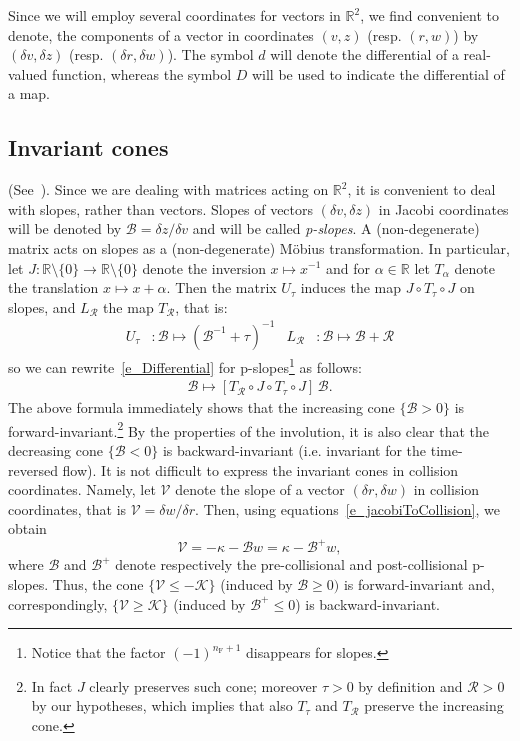 \documentclass[AHL, Unicode, longabstracts,published]{cedram}
\newcommand{\ct}{r}
\newcommand{\fft}{\tau}
\newcommand{\curv}{\kappa}
\newcommand{\inv}{^{-1}}
\newcommand{\fixw}{\mathrm{F}}
\newcommand{\reals}{\mathbb{R}}
\newcommand{\bR}{\mathbb{R}}
\newcommand{\cB}{\mathcal{B}}
\newcommand{\cK}{\mathcal{K}}
\newcommand{\cpar}{\mathcal{R}}
\newcommand{\pslope}{\mathcal{B}}
\newcommand{\cslope}{\mathcal{V}}
\newcommand{\ppPrivate}[2]{#1^{#2}}
\newcommand{\prePrivate}[1]{\ppPrivate{#1}{-}}
\newcommand{\postPrivate}[1]{\ppPrivate{#1}{+}}
\newcommand{\prpslope}{\prePrivate{\pslope}}
\newcommand{\popslope}{\postPrivate{\pslope}}
\renewcommand{\prpslope}{\cB}
\renewcommand{\prpslope}{\cB}
\renewcommand{\prpslope}{\cB}
\begin{document}
\begin{rema}
Since we will employ several coordinates for vectors in $\bR^{2}$, we find convenient to denote, the components of a vector in coordinates $(v,z)$ (resp. $(\ct,w)$) by $(\delta v,\delta z)$ (resp. $(\delta\ct,\delta w)$). The symbol $d$ will denote the differential of a real-valued function, whereas the symbol $D$ will be used to indicate the differential of a map.
\end{rema}

\subsection{Invariant cones}\label{s_invariantCones}

(See~\cite[\S3.8]{ChM}). Since we are dealing with matrices acting on $\bR^2$, it is convenient to deal with slopes, rather than vectors. Slopes of vectors $(\delta v,\delta z)$ in Jacobi coordinates will be denoted by $\pslope= \delta z/\delta v$ and will be called \emph{p-slopes}. A (non-degenerate) matrix acts on slopes as a (non-degenerate) M\"obius transformation. In particular, let $J:\reals\setminus\{0\}\to\reals\setminus\{0\}$ denote the inversion $x\mapsto x\inv$ and for $\alpha\in\bR$ let $T_\alpha$ denote the translation $x\mapsto x+\alpha$. Then the matrix $U_\fft$ induces the map $J\circ T_\fft\circ J$ on slopes, and $L_\cpar$ the map $T_\cpar$, that is:
\begin{align}\label{e_slopeEvolution}
U_\fft & :\pslope\mapsto{\left(\pslope\inv+\fft\right)}\inv & L_\cpar & :\pslope\mapsto\pslope + \cpar
\end{align}
so we can rewrite~\eqref{e_Differential} for p-slopes\footnote{Notice that the factor $ {(-1)}^{n_\fixw+1}$ disappears for slopes.} as follows:
\begin{align}\label{e_evolutionB}
\pslope\mapsto \left[T_{\cpar}\circ J\circ T_{\fft}\circ J\right]\,\pslope.
\end{align}
The above formula immediately shows that the increasing cone $\{\pslope>0\}$ is forward-invariant.\footnote{In fact $J$ clearly preserves such cone; moreover $\fft>0$ by definition and $\cpar>0$ by our hypotheses, which implies that also $T_\fft$ and $T_\cpar$ preserve the increasing cone.}
By the properties of the involution, it is also clear that the decreasing cone $\{\pslope<0\}$ is backward-invariant (i.e. invariant for the time-reversed flow). It is not difficult to express the invariant cones in collision coordinates. Namely, let $\cslope$ denote the slope of a vector $(\delta\ct,\delta w)$ in collision coordinates, that is $\cslope = \delta w/\delta\ct$. Then, using equations~\eqref{e_jacobiToCollision}, we obtain
\begin{equation}\label{e_slopeCollision}
\cslope = - \curv - \prpslope w = \curv - \popslope w,
\end{equation}
where $\prpslope$ and $\popslope$ denote respectively the pre-collisional and post-collisional p-slopes. Thus, the cone $\{\cslope \leq -\cK\}$ (induced by $\prpslope\geq 0)$ is forward-invariant and, correspondingly, $\{\cslope\geq\cK\}$ (induced by $\popslope\leq0$) is backward-invariant.
\end{document}
